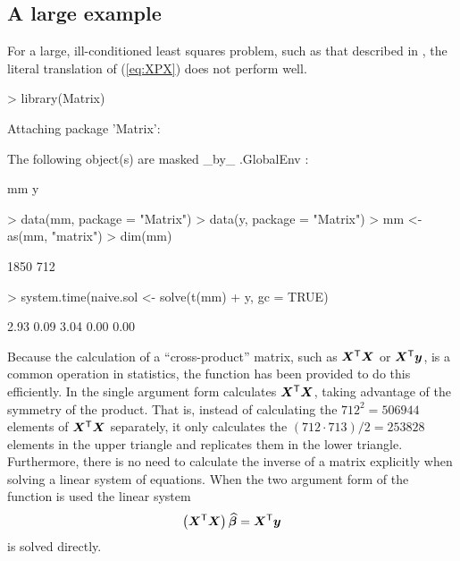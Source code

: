\documentclass{article}
\begin{document}
\subsection{A large example}
\label{sec:largeLSQ}

For a large, ill-conditioned least squares problem, such as that
described in \citet{koen:ng:2003}, the literal translation of
(\ref{eq:XPX}) does not perform well.
\begin{Schunk}
\begin{Sinput}
> library(Matrix)
\end{Sinput}
\begin{Soutput}
Attaching package 'Matrix':


	The following object(s) are masked _by_ .GlobalEnv :

	 mm y 
\end{Soutput}
\begin{Sinput}
> data(mm, package = "Matrix")
> data(y, package = "Matrix")
> mm <- as(mm, "matrix")
> dim(mm)
\end{Sinput}
\begin{Soutput}
[1] 1850  712
\end{Soutput}
\begin{Sinput}
> system.time(naive.sol <- solve(t(mm) %*% mm) %*% t(mm) %*% 
+     y, gc = TRUE)
\end{Sinput}
\begin{Soutput}
[1] 2.93 0.09 3.04 0.00 0.00
\end{Soutput}
\end{Schunk}

Because the calculation of a ``cross-product'' matrix, such as
$\bm{X}^\mathsf{T}\bm{X}$ or $\bm{X}^\mathsf{T}\bm{y}$, is a common operation in
statistics, the  function has been provided to do
this efficiently.  In the single argument form 
calculates $\bm{X}^\mathsf{T}\bm{X}$, taking advantage of the symmetry of the
product.  That is, instead of calculating the $712^2=506944$ elements of
$\bm{X}^\mathsf{T}\bm{X}$ separately, it only calculates the $(712\cdot
713)/2=253828$ elements in the upper triangle and replicates them in
the lower triangle. Furthermore, there is no need to calculate the
inverse of a matrix explicitly when solving a
linear system of equations.  When the two argument form of the 
function is used the linear system
\begin{equation}
  \label{eq:LSQsol}
  \left(\bm{X}^\mathsf{T}\bm{X}\right) \widehat{\bm{\beta}} = \bm{X}^\mathsf{T}\bm{y}
\end{equation}
is solved directly.
\end{document}
